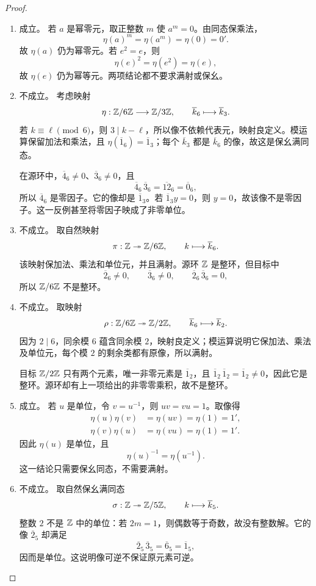 \begin{proof}

\begin{enumerate}[label=(\roman*)]\item 成立。
若 $a$ 是幂零元，取正整数 $m$ 使 $a^m=0$。由同态保乘法，
\[
\eta(a)^m=\eta(a^m)=\eta(0)=0'.
\]
故 $\eta(a)$ 仍为幂零元。若 $e^2=e$，则
\[
\eta(e)^2=\eta(e^2)=\eta(e),
\]
故 $\eta(e)$ 仍为幂等元。两项结论都不要求满射或保幺。

\item 不成立。
考虑映射
\[
\eta:\mathbb Z/6\mathbb Z\longrightarrow\mathbb Z/3\mathbb Z,\qquad
\overline{k}_{6}\longmapsto\overline{k}_{3}.
\]
若 $k\equiv\ell\pmod6$，则 $3\mid k-\ell$，所以像不依赖代表元，映射良定义。模运算保留加法和乘法，且 $\eta(\overline1_6)=\overline1_3$；每个 $\overline{k}_3$ 都是 $\overline{k}_6$ 的像，故这是保幺满同态。

在源环中，$\overline4_6\ne0$、$\overline3_6\ne0$，且
\[
\overline4_6\,\overline3_6=\overline{12}_6=\overline0_6,
\]
所以 $\overline4_6$ 是零因子。它的像却是 $\overline1_3$。若 $\overline1_3 y=0$，则 $y=0$，故该像不是零因子。这一反例甚至将零因子映成了非零单位。

\item 不成立。
取自然映射
\[
\pi:\mathbb Z\twoheadrightarrow\mathbb Z/6\mathbb Z,\qquad k\longmapsto\overline{k}_6.
\]
该映射保加法、乘法和单位元，并且满射。源环 $\mathbb Z$ 是整环，但目标中
\[
\overline2_6\ne0,\qquad \overline3_6\ne0,\qquad
\overline2_6\,\overline3_6=0,
\]
所以 $\mathbb Z/6\mathbb Z$ 不是整环。

\item 不成立。
取映射
\[
\rho:\mathbb Z/6\mathbb Z\twoheadrightarrow\mathbb Z/2\mathbb Z,\qquad
\overline{k}_{6}\longmapsto\overline{k}_{2}.
\]
因为 $2\mid6$，同余模 $6$ 蕴含同余模 $2$，映射良定义；模运算说明它保加法、乘法及单位元，每个模 $2$ 的剩余类都有原像，所以满射。

目标 $\mathbb Z/2\mathbb Z$ 只有两个元素，唯一非零元素是 $\overline1_2$，且 $\overline1_2\,\overline1_2=\overline1_2\ne0$，因此它是整环。源环却有上一项给出的非零零乘积，故不是整环。

\item 成立。
若 $u$ 是单位，令 $v=u^{-1}$，则 $uv=vu=1$。取像得
\begin{align*}
\eta(u)\eta(v)&=\eta(uv)=\eta(1)=1',\\
\eta(v)\eta(u)&=\eta(vu)=\eta(1)=1'.
\end{align*}
因此 $\eta(u)$ 是单位，且
\[
\eta(u)^{-1}=\eta(u^{-1}).
\]
这一结论只需要保幺同态，不需要满射。

\item 不成立。
取自然保幺满同态
\[
\sigma:\mathbb Z\twoheadrightarrow\mathbb Z/5\mathbb Z,\qquad
k\longmapsto\overline{k}_5.
\]
整数 $2$ 不是 $\mathbb Z$ 中的单位：若 $2m=1$，则偶数等于奇数，故没有整数解。它的像 $\overline2_5$ 却满足
\[
\overline2_5\,\overline3_5=\overline6_5=\overline1_5,
\]
因而是单位。这说明像可逆不保证原元素可逆。
\end{enumerate}

\end{proof}

